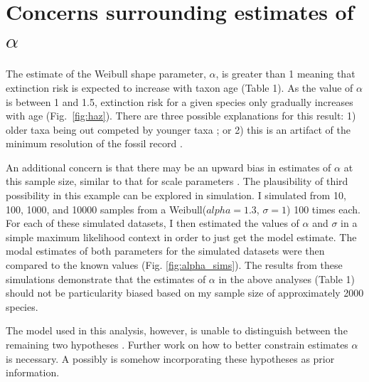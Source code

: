 \documentclass{article}
\begin{document}
\section{Concerns surrounding estimates of $\alpha$}
The estimate of the Weibull shape parameter, $\alpha$, is greater than 1 meaning that extinction risk is expected to increase with taxon age (Table 1). As the value of $\alpha$ is between 1 and 1.5, extinction risk for a given species only gradually increases with age (Fig.~\ref{fig:haz}). There are three possible explanations for this result: 1) older taxa being out competed by younger taxa \cite{Wagner2014b}; or 2) this is an artifact of the minimum resolution of the fossil record \cite{Sepkoski1975}. 

An additional concern is that there may be an upward bias in estimates of $\alpha$ at this sample size, similar to that for scale parameters \cite{Gelman2013d}. The plausibility of third possibility in this example can be explored in simulation. I simulated from 10, 100, 1000, and 10000 samples from a Weibull(\(alpha = 1.3\), \(\sigma = 1\)) 100 times each. For each of these simulated datasets, I then estimated the values of \(\alpha\) and \(\sigma\) in a simple maximum likelihood context in order to just get the model estimate. The modal estimates of both parameters for the simulated datasets were then compared to the known values (Fig. \ref{fig:alpha_sims}). The results from these simulations demonstrate that the estimates of \(\alpha\) in the above analyses (Table 1) should not be particularity biased based on my sample size of approximately 2000 species. 

The model used in this analysis, however, is unable to distinguish between the remaining two hypotheses \cite{Sepkoski1975,Wagner2014b}. Further work on how to better constrain estimates $\alpha$ is necessary. A possibly is somehow incorporating these hypotheses as prior information.
\end{document}
